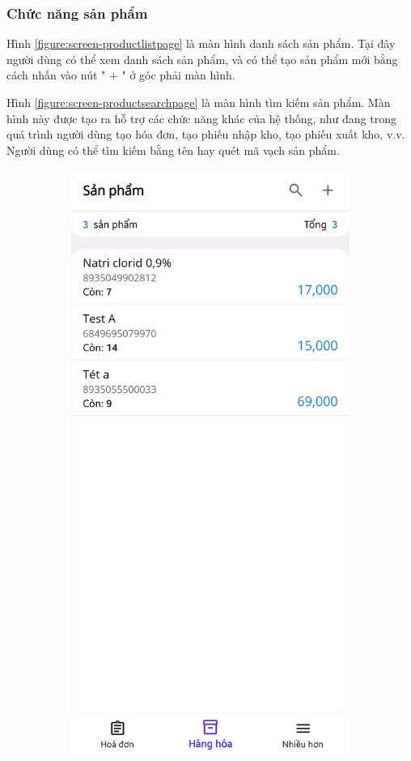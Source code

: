 \documentclass[../DoAn.tex]{subfiles}
\begin{document}
\subsubsection{Chức năng sản phẩm}
Hình \ref{figure:screen-productlistpage} là màn hình danh sách sản phẩm. Tại đây người dùng có thể xem danh sách sản phẩm, và có thể tạo sản phẩm mới bằng cách nhấn vào nút " + " ở góc phải màn hình.

Hình \ref{figure:screen-productsearchpage} là màn hình tìm kiếm sản phẩm. Màn hình này được tạo ra hỗ trợ các chức năng khác của hệ thống, như đang trong quá trình người dùng tạo hóa đơn, tạo phiếu nhập kho, tạo phiếu xuất kho, v.v. Người dùng có thể tìm kiếm bằng tên hay quét mã vạch sản phẩm.
\begin{figure}[H]
    \begin{subfigure}{0.49\linewidth}
        \centering
        \includegraphics[width=0.9\linewidth]{Hinhve/design/screens/ProductListPage}

\end{subfigure}
\end{figure}
\end{document}
